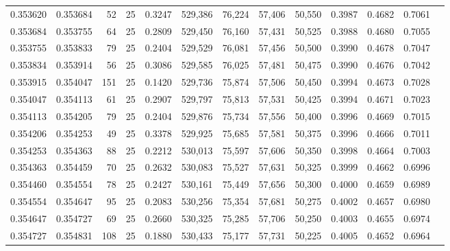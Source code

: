 \begin{tabular}{rrrrrrrrrrrrr}
0.353620 & 0.353684 &    52 &  25 &                                     0.3247 & 529,386 &  76,224 &  57,406 &  50,550 & 0.3987 & 0.4682 & 0.7061 \\
0.353684 & 0.353755 &    64 &  25 &                                     0.2809 & 529,450 &  76,160 &  57,431 &  50,525 & 0.3988 & 0.4680 & 0.7055 \\
0.353755 & 0.353833 &    79 &  25 &                                     0.2404 & 529,529 &  76,081 &  57,456 &  50,500 & 0.3990 & 0.4678 & 0.7047 \\
0.353834 & 0.353914 &    56 &  25 &                                     0.3086 & 529,585 &  76,025 &  57,481 &  50,475 & 0.3990 & 0.4676 & 0.7042 \\
0.353915 & 0.354047 &   151 &  25 &                                     0.1420 & 529,736 &  75,874 &  57,506 &  50,450 & 0.3994 & 0.4673 & 0.7028 \\
0.354047 & 0.354113 &    61 &  25 &                                     0.2907 & 529,797 &  75,813 &  57,531 &  50,425 & 0.3994 & 0.4671 & 0.7023 \\
0.354113 & 0.354205 &    79 &  25 &                                     0.2404 & 529,876 &  75,734 &  57,556 &  50,400 & 0.3996 & 0.4669 & 0.7015 \\
0.354206 & 0.354253 &    49 &  25 &                                     0.3378 & 529,925 &  75,685 &  57,581 &  50,375 & 0.3996 & 0.4666 & 0.7011 \\
0.354253 & 0.354363 &    88 &  25 &                                     0.2212 & 530,013 &  75,597 &  57,606 &  50,350 & 0.3998 & 0.4664 & 0.7003 \\
0.354363 & 0.354459 &    70 &  25 &                                     0.2632 & 530,083 &  75,527 &  57,631 &  50,325 & 0.3999 & 0.4662 & 0.6996 \\
0.354460 & 0.354554 &    78 &  25 &                                     0.2427 & 530,161 &  75,449 &  57,656 &  50,300 & 0.4000 & 0.4659 & 0.6989 \\
0.354554 & 0.354647 &    95 &  25 &                                     0.2083 & 530,256 &  75,354 &  57,681 &  50,275 & 0.4002 & 0.4657 & 0.6980 \\
0.354647 & 0.354727 &    69 &  25 &                                     0.2660 & 530,325 &  75,285 &  57,706 &  50,250 & 0.4003 & 0.4655 & 0.6974 \\
0.354727 & 0.354831 &   108 &  25 &                                     0.1880 & 530,433 &  75,177 &  57,731 &  50,225 & 0.4005 & 0.4652 & 0.6964 \\

\end{tabular}
